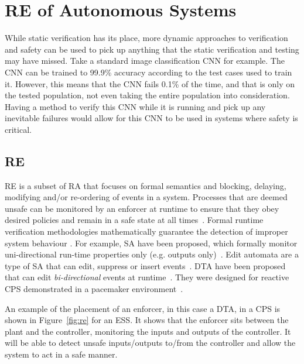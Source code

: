 \section{\acf{RE} of Autonomous Systems}
While static verification has its place, more dynamic approaches to verification and safety can be used to pick up anything that the static verification and testing may have missed.
Take a standard image classification \ac{CNN} for example.
The \ac{CNN} can be trained to 99.9\% accuracy according to the test cases used to train it.
However, this means that the \ac{CNN} fails 0.1\% of the time, and that is only on the tested population, not even taking the entire population into consideration.
Having a method to verify this \ac{CNN} while it is running and pick up any inevitable failures would allow for this \ac{CNN} to be used in systems where safety is critical.

\subsection{\acf{RE}}
\ac{RE} is a subset of \ac{RA} that focuses on formal semantics and blocking, delaying, modifying and/or re-ordering of events in a system. 
Processes that are deemed unsafe can be monitored by an enforcer at runtime to ensure that they obey desired policies and remain in a safe state at all times~\cite{theoryRE}. 
Formal runtime verification methodologies mathematically guarantee the detection of improper system behaviour \cite{RuntimeAssuranceForComplexCPS}.
For example, \ac{SA} have been proposed, which formally monitor uni-directional run-time properties only (e.g. outputs only)~\cite{enfsafepol}.
Edit automata are a type of \ac{SA} that can edit, suppress or insert events~\cite{editautomata}. 
\ac{DTA} have been proposed that can edit \textit{bi-directional} events at runtime~\cite{recps}. 
They were designed for reactive \ac{CPS} demonstrated in a pacemaker environment~\cite{recps}. 

An example of the placement of an enforcer, in this case a \ac{DTA}, in a \ac{CPS} is shown in Figure~\ref{fig:re} for an \acf{ESS}.
It shows that the enforcer sits between the plant and the controller, monitoring the inputs and outputs of the controller.
It will be able to detect unsafe inputs/outputs to/from the controller and allow the system to act in a safe manner.

